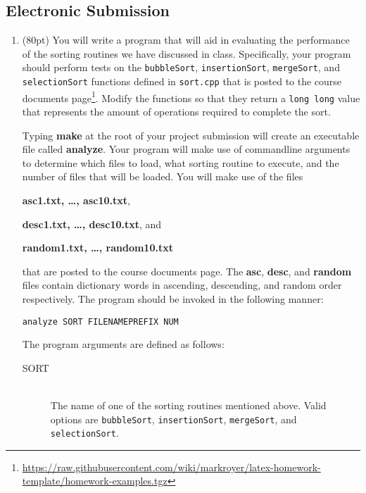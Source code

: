 \documentclass{article}
\newcommand{\pts}[1]{\addtocounter{points}{#1}(#1pt)}
\newcommand{\tspace}{\vspace{4cm}}
\begin{document}
\begin{spacing}{1.1}
\begin{enumerate}[leftmargin=*]
\tspace

\end{enumerate}

\subsection*{Electronic Submission}

\lstset{
  breaklines=false
}

\begin{enumerate}[leftmargin=*, resume]

\item\label{lastQuestion} \pts{80} You will write a program that will
  aid in evaluating the performance of the sorting routines we have
  discussed in class.  Specifically, your program should perform tests
  on the \lstinline$bubbleSort$, \lstinline$insertionSort$,
  \lstinline$mergeSort$, and \lstinline$selectionSort$ functions
  defined in \lstinline$sort.cpp$ that is posted to the course
  documents
  page\footnote{\url{https://raw.githubusercontent.com/wiki/markroyer/latex-homework-template/homework-examples.tgz}}. Modify
  the functions so that they return a \lstinline$long long$ value that
  represents the amount of operations required to complete the sort.

Typing \textbf{make} at the root of your project submission will
create an executable file called \textbf{analyze}. Your program will
make use of commandline arguments to determine which files to
load, what sorting routine to execute, and the number of files that
will be loaded.  You will make use of the files 

\textbf{asc1.txt, \dots , asc10.txt},

\textbf{desc1.txt, \dots , desc10.txt}, and

\textbf{random1.txt, \dots , random10.txt}

that are posted to the course documents page. The \textbf{asc},
\textbf{desc}, and \textbf{random} files contain dictionary words in
ascending, descending, and random order respectively. The program
should be invoked in the following manner:

\begin{verbatim}
analyze SORT FILENAMEPREFIX NUM
\end{verbatim}

The program arguments are defined as follows:

\begin{description}

\item[SORT] \hfill \\ The name of one of the sorting routines mentioned above.  Valid
options are \lstinline$bubbleSort$, \lstinline$insertionSort$,
\lstinline$mergeSort$, and \lstinline$selectionSort$.


\end{description}
\end{enumerate}
\end{spacing}
\end{document}
